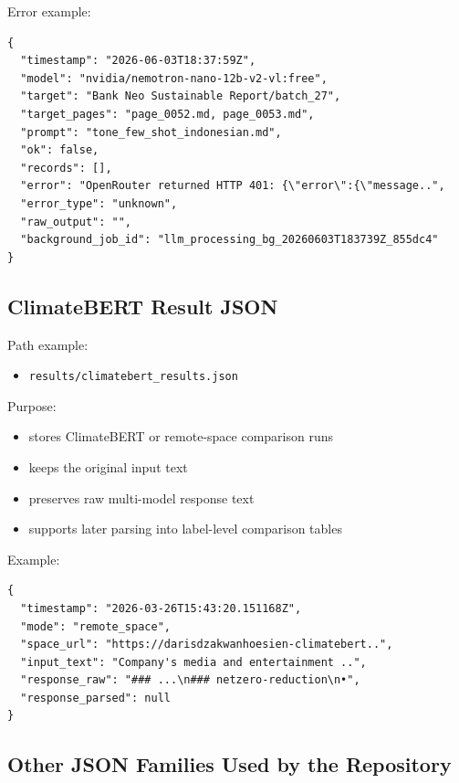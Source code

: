 \documentclass[english, online, cse, master]{dithesis}
\providecommand{\tightlist}{\setlength{\itemsep}{0pt}\setlength{\parskip}{0pt}}
\begin{document}
Error example:

\begin{verbatim}
{
  "timestamp": "2026-06-03T18:37:59Z",
  "model": "nvidia/nemotron-nano-12b-v2-vl:free",
  "target": "Bank Neo Sustainable Report/batch_27",
  "target_pages": "page_0052.md, page_0053.md",
  "prompt": "tone_few_shot_indonesian.md",
  "ok": false,
  "records": [],
  "error": "OpenRouter returned HTTP 401: {\"error\":{\"message..",
  "error_type": "unknown",
  "raw_output": "",
  "background_job_id": "llm_processing_bg_20260603T183739Z_855dc4"
}
\end{verbatim}

\subsection{ClimateBERT Result JSON}\label{climatebert-result-json}

Path example:

\begin{itemize}
\tightlist
\item
  \texttt{results/climatebert\_results.json}
\end{itemize}

Purpose:

\begin{itemize}
\tightlist
\item
  stores ClimateBERT or remote-space comparison runs
\item
  keeps the original input text
\item
  preserves raw multi-model response text
\item
  supports later parsing into label-level comparison tables
\end{itemize}

Example:

\begin{verbatim}
{
  "timestamp": "2026-03-26T15:43:20.151168Z",
  "mode": "remote_space",
  "space_url": "https://darisdzakwanhoesien-climatebert..",
  "input_text": "Company's media and entertainment ..",
  "response_raw": "### ...\n### netzero-reduction\n•",
  "response_parsed": null
}
\end{verbatim}

\subsection{Other JSON Families Used by the Repository}\label{other-json-families-used-by-the-repository}
\end{document}
